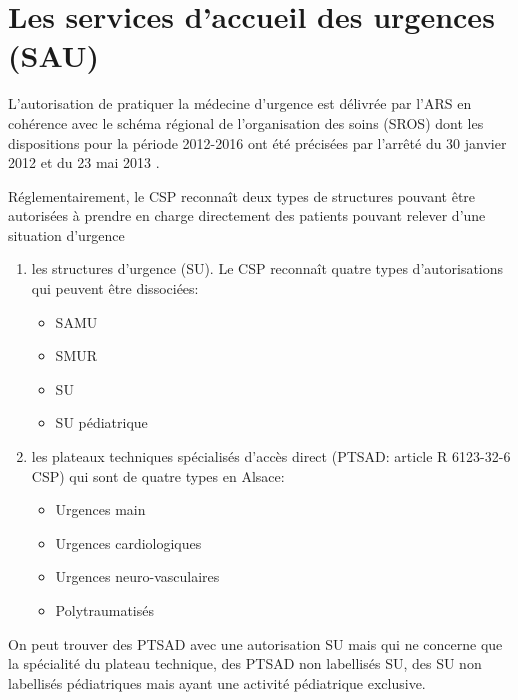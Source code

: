 \documentclass[12pt,english,french,twoside]{book}\usepackage[]{graphicx}\usepackage[]{color}
\begin{document}
\section{Les services d'accueil des urgences (SAU)}


L'autorisation de pratiquer la médecine d'urgence est délivrée par l'ARS en cohérence avec le schéma régional de l'organisation des soins (SROS) dont les dispositions pour la période 2012-2016 ont été précisées par l'arrêté du 30 janvier 2012 \cite{14} et du 23 mai 2013 \cite{15}.

Réglementairement, le CSP reconnaît deux types de structures pouvant être autorisées à prendre en charge directement des patients pouvant relever d'une situation d'urgence
\begin{enumerate}
  \item les structures d'urgence (SU). Le CSP reconnaît quatre types d'autorisations qui peuvent être dissociées:
    \begin{itemize}
      \item SAMU
      \item SMUR
      \item SU
      \item SU pédiatrique
    \end{itemize}

  \item les plateaux techniques spécialisés d'accès direct (PTSAD: article R 6123-32-6 CSP) qui sont de quatre types en Alsace:
    \begin{itemize}
      \item Urgences main
      \item Urgences cardiologiques
      \item Urgences neuro-vasculaires
      \item Polytraumatisés
    \end{itemize}
\end{enumerate}

On peut trouver des PTSAD avec une autorisation SU mais qui ne concerne que la spécialité du plateau technique, des PTSAD non labellisés SU, des SU non labellisés pédiatriques mais ayant une activité pédiatrique exclusive.
\end{document}
